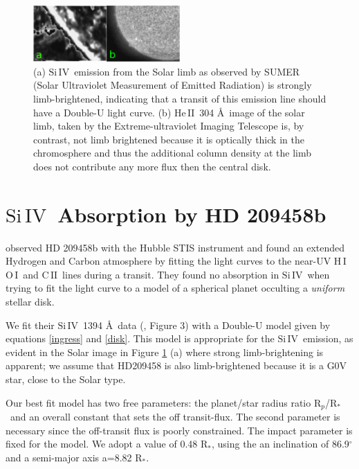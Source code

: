 \documentclass[manuscript]{aastex}
\newcommand{\cii}{\ensuremath{\mathrm{C}\,\scriptstyle \mathrm{II}}}
\newcommand{\oi}{\ensuremath{\mathrm{O}\,\scriptstyle \mathrm{I}}}
\newcommand{\hi}{\ensuremath{\mathrm{H}\,\scriptstyle \mathrm{I}}}
\newcommand{\heII}{\ensuremath{\mathrm{He}\,\scriptstyle \mathrm{II}}}
\newcommand{\siIV}{\ensuremath{\mathrm{Si}\,\scriptstyle \mathrm{IV}}}
\newcommand{\p}{R$_p$/R$_*$}
\begin{document}
\begin{figure}
\begin{center}
\includegraphics[width=0.5\textwidth]{limb_compare_siIV_heII.eps}
\caption{(a) \siIV\ emission from the Solar limb as observed by SUMER (Solar Ultraviolet Measurement of Emitted Radiation) \citep{wiik} is strongly limb-brightened, indicating that a transit of this emission line should have a Double-U light curve. (b) \heII\ 304 \AA\ image of the solar limb, taken by the Extreme-ultraviolet Imaging Telescope \citep{feldman} is, by contrast, not limb brightened because it is optically thick in the chromosphere and thus the additional column density at the limb does not contribute any more flux then the central disk.}
\label{limbs}
\end{center}
\end{figure}

\section{\siIV\ Absorption by HD 209458b} \label{osiris}

\citet{viddisc} observed HD 209458b with the Hubble STIS instrument and found
an extended Hydrogen and Carbon atmosphere by fitting the light curves
to the near-UV \hi\, \oi\ and \cii\ lines during a transit. They found no absorption in \siIV\ when trying to fit the light curve to a model of a spherical planet occulting a {\it uniform} stellar disk.

We fit their \siIV\ 1394 \AA\ data (\citet{vidmad}, Figure 3) with a Double-U model given by equations \ref{ingress} and \ref{disk}. This model is appropriate for the \siIV\ emission, as evident in the Solar image in Figure \ref{limbs} (a) where strong limb-brightening is apparent; we assume that HD209458 is also limb-brightened because it is a G0V star, close to the Solar type.

Our best fit model has two free parameters: the planet/star radius ratio \p\ and an overall constant that sets the off transit-flux. The second parameter is necessary since the off-transit flux is poorly constrained. The impact parameter 
 is fixed for the model. We adopt a value of 0.48 R$_*$, using the an inclination of 86.9$^\circ$ \citep{knutsonprop} and a semi-major axis a=8.82 R$_*$.
\end{document}
